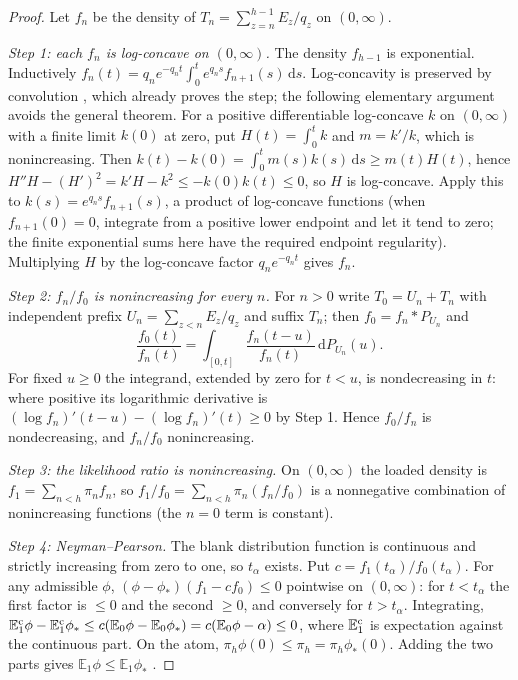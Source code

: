 \documentclass[11pt,a4paper]{article}
\theoremstyle{plain}
\theoremstyle{definition}
\theoremstyle{remark}
\newcommand{\E}{\mathbb E}
\newcommand{\dd}{\,\mathrm d}
\begin{document}
\begin{proof}
Let $f_n$ be the density of $T_n=\sum_{z=n}^{h-1}E_z/q_z$ on $(0,\infty)$.

\emph{Step 1: each $f_n$ is log-concave on $(0,\infty)$.} The density $f_{h-1}$ is exponential. Inductively $f_n(t)=q_ne^{-q_nt}\int_0^te^{q_ns}f_{n+1}(s)\dd s$. Log-concavity is preserved by convolution \citep{prekopa1973,bagnoli2005}, which already proves the step; the following elementary argument avoids the general theorem. For a positive differentiable log-concave $k$ on $(0,\infty)$ with a finite limit $k(0)$ at zero, put $H(t)=\int_0^tk$ and $m=k'/k$, which is nonincreasing. Then $k(t)-k(0)=\int_0^tm(s)k(s)\dd s\ge m(t)H(t)$, hence $H''H-(H')^2=k'H-k^2\le-k(0)k(t)\le0$, so $H$ is log-concave. Apply this to $k(s)=e^{q_ns}f_{n+1}(s)$, a product of log-concave functions (when $f_{n+1}(0)=0$, integrate from a positive lower endpoint and let it tend to zero; the finite exponential sums here have the required endpoint regularity). Multiplying $H$ by the log-concave factor $q_ne^{-q_nt}$ gives $f_n$.

\emph{Step 2: $f_n/f_0$ is nonincreasing for every $n$.} For $n>0$ write $T_0=U_n+T_n$ with independent prefix $U_n=\sum_{z<n}E_z/q_z$ and suffix $T_n$; then $f_0=f_n*P_{U_n}$ and
\[
\frac{f_0(t)}{f_n(t)}=\int_{[0,t]}\frac{f_n(t-u)}{f_n(t)}\dd P_{U_n}(u).
\]
For fixed $u\ge0$ the integrand, extended by zero for $t<u$, is nondecreasing in $t$: where positive its logarithmic derivative is $(\log f_n)'(t-u)-(\log f_n)'(t)\ge0$ by Step 1. Hence $f_0/f_n$ is nondecreasing, and $f_n/f_0$ nonincreasing.

\emph{Step 3: the likelihood ratio is nonincreasing.} On $(0,\infty)$ the loaded density is $f_1=\sum_{n<h}\pi_nf_n$, so $f_1/f_0=\sum_{n<h}\pi_n(f_n/f_0)$ is a nonnegative combination of nonincreasing functions (the $n=0$ term is constant).

\emph{Step 4: Neyman--Pearson.} The blank distribution function is continuous and strictly increasing from zero to one, so $t_\alpha$ exists. Put $c=f_1(t_\alpha)/f_0(t_\alpha)$. For any admissible $\phi$, $(\phi-\phi_*)(f_1-cf_0)\le0$ pointwise on $(0,\infty)$: for $t<t_\alpha$ the first factor is $\le0$ and the second $\ge0$, and conversely for $t>t_\alpha$. Integrating, $\E_1^{\rm c}\phi-\E_1^{\rm c}\phi_*\le c(\E_0\phi-\E_0\phi_*)=c(\E_0\phi-\alpha)\le0$, where $\E_1^{\rm c}$ is expectation against the continuous part. On the atom, $\pi_h\phi(0)\le\pi_h=\pi_h\phi_*(0)$. Adding the two parts gives $\E_1\phi\le\E_1\phi_*$ \citep{neyman1933,karlinrubin1956}.
\end{proof}
\end{document}
